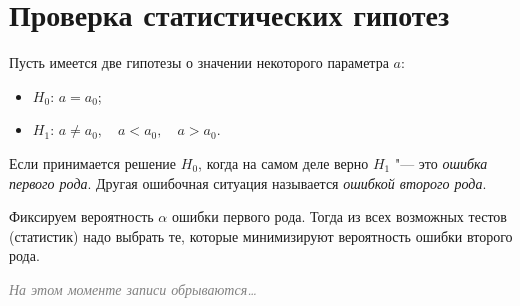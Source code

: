 \section{Проверка статистических гипотез}

Пусть имеется две гипотезы о значении некоторого параметра $ a $:
\begin{itemize}
    \item $ H_0 $: $ a = a_0 $;
    \item $ H_1 $: $ a \ne a_0, \quad a < a_0, \quad a > a_0 $.
\end{itemize}
Если принимается решение $ H_0 $, когда на самом деле верно $ H_1 $ "--- это \emph{ошибка первого
рода}.
Другая ошибочная ситуация называется \emph{ошибкой второго рода}.

Фиксируем вероятность $ \alpha $ ошибки первого рода.
Тогда из всех возможных тестов (статистик) надо выбрать те, которые минимизируют вероятность ошибки
второго рода.

\textcolor{gray}{\textit{На этом моменте записи обрываются\dots}}
